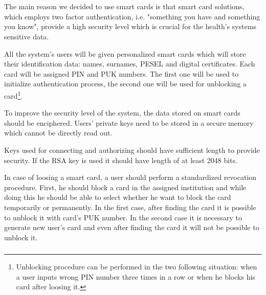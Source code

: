 \chapter{}

\section{}

\subsection{}

The main reason we decided to use smart cards is that smart card solutions, which employs two factor authentication, i.e. "something you have and something you know", provide a high security level which is crucial for the health's systems sensitive data.

All the system's users will be given personalized smart cards which will store their identification data: names, surnames, PESEL and digital certificates. Each card will be assigned PIN and PUK numbers. The first one will be used to initialize authentication process, the second one will be used for unblocking a card\footnote{Unblocking procedure can be performed in the two following situation: when a user inputs wrong PIN number three times in a row or when he blocks his card after loosing it.}. 

To improve the security level of the system, the data  stored on smart cards should be enciphered. Users' private keys need to be stored in a secure memory which cannot be directly read out. 

Keys used for connecting and authorizing should have sufficient length to provide security. If the RSA key is used it should have length of at least 2048 bits. 

In case of loosing a smart card, a user should perform a standardized revocation procedure. First, he should block a card in the assigned institution and while doing this he should be able to select whether he want to block the card temporarily or permanently. In the first case, after finding the card it is possible to unblock it with card's PUK number. In the second case it is necessary to generate new user's card and even after finding the card it will not be possible to unblock it.

\subsection{}

